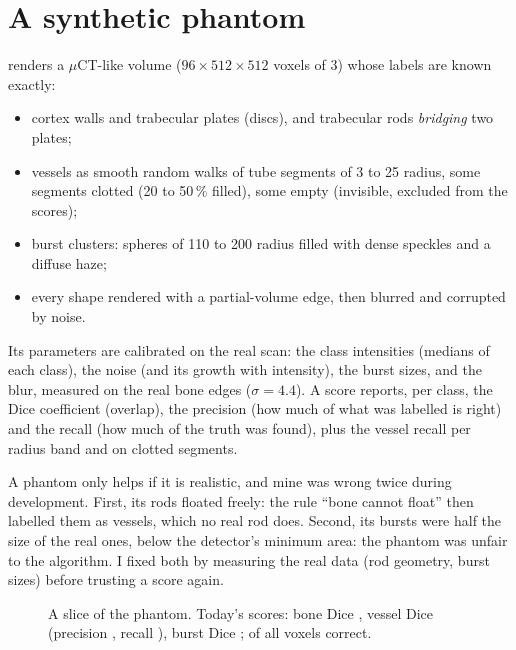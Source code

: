 \section{A synthetic phantom}

 renders a $\mu$CT-like volume ($96 \times 512 \times 512$ voxels of 3\um) whose
labels are known exactly:
\begin{itemize}
  \item cortex walls and trabecular plates (discs), and trabecular rods \emph{bridging} two plates;
  \item vessels as smooth random walks of tube segments of 3 to 25\um{} radius, some segments clotted
        (20 to 50\,\% filled), some empty (invisible, excluded from the scores);
  \item burst clusters: spheres of 110 to 200\um{} radius filled with dense speckles and a diffuse haze;
  \item every shape rendered with a partial-volume edge, then blurred and corrupted by noise.
\end{itemize}
Its parameters are calibrated on the real scan: the class intensities (medians of each class), the noise
(and its growth with intensity), the burst sizes, and the blur, measured on the real bone edges
($\sigma = 4.4$\um). A score reports, per class, the Dice coefficient (overlap), the precision (how much
of what was labelled is right) and the recall (how much of the truth was found), plus the vessel recall
per radius band and on clotted segments.

A phantom only helps if it is realistic, and mine was wrong twice during development. First, its rods
floated freely: the rule ``bone cannot float'' then labelled them as vessels, which no real rod does.
Second, its bursts were half the size of the real ones, below the detector's minimum area: the phantom
was unfair to the algorithm. I fixed both by measuring the real data (rod geometry, burst sizes)
before trusting a score again.

\begin{figure}[ht]
\centering
{}\hfill
{}\hfill
{}
\caption{A slice of the phantom. Today's scores: bone Dice \pbValueBoneDice, vessel Dice
  \pbValueVesselDice{} (precision \pbValueVesselPrecision, recall \pbValueVesselRecall), burst Dice
  \pbValueBurstDice; \pbValueAccuracy{} of all voxels correct.}
\label{fig:phantom}
\end{figure}

